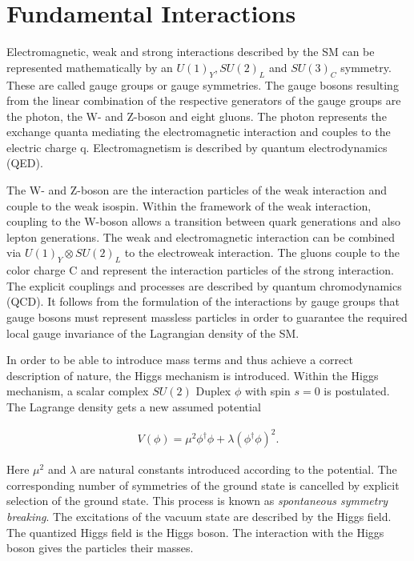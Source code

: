 \documentclass[12pt, a4paper]{thesis}
\begin{document}
\section{Fundamental Interactions}
\label{sec:org8c44b2a}

Electromagnetic, weak and strong interactions described by the SM can
be represented mathematically by an \(U(1)_{Y}, SU(2)_{L}\) and
\(SU(3)_{C}\) symmetry. These are called gauge groups or gauge
symmetries. The gauge bosons resulting from the linear combination of
the respective generators of the gauge groups are the photon, the W-
and Z-boson and eight gluons. The photon represents the exchange
quanta mediating the electromagnetic interaction and couples to the
electric charge q. Electromagnetism is described by quantum
electrodynamics (QED).

The W- and Z-boson are the interaction particles of the weak
interaction and couple to the weak isospin. Within the framework of
the weak interaction, coupling to the W-boson allows a transition
between quark generations and also lepton generations. The weak and
electromagnetic interaction can be combined via \(U(1)_{Y} \otimes
SU(2)_{L}\) to the electroweak interaction. The gluons couple to the
color charge C and represent the interaction particles of the strong
interaction. The explicit couplings and processes are described by
quantum chromodynamics (QCD).  It follows from the formulation of the
interactions by gauge groups that gauge bosons must represent massless
particles in order to guarantee the required local gauge invariance of
the Lagrangian density of the SM.

In order to be able to introduce mass terms and thus achieve a correct
description of nature, the Higgs mechanism is introduced.  Within the
Higgs mechanism, a scalar complex $SU(2)$ Duplex $\phi$ with spin
$s=0$ is postulated. The Lagrange density gets a new assumed potential

\begin{align}
V(\phi) = \mu^2 \phi^ \dagger \phi + \lambda (\phi^\dagger \phi)^2.
\end{align}

Here $\mu^2$ and $\lambda$ are natural constants introduced according
to the potential. The corresponding number of symmetries of the ground
state is cancelled by explicit selection of the ground state. This
process is known as \emph{spontaneous symmetry breaking}. The
excitations of the vacuum state are described by the Higgs field. The
quantized Higgs field is the Higgs boson. The interaction with the
Higgs boson gives the particles their masses.
\end{document}
